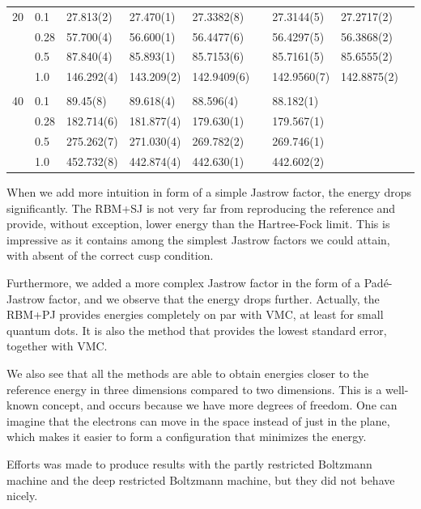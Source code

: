 {\begin{landscape}
\begin{table}
\begin{tabularx}{\hsize}{llR{2.65cm}R{2.65cm}R{2.65cm}R{2.65cm}R{2.65cm}R{2.65cm}R{2.65cm}}
		20 & 0.1 & 27.813(2) & 27.470(1) & 27.3382(8) & & 27.3144(5) & 27.2717(2) \\ 
		& 0.28 & 57.700(4) & 56.600(1) & 56.4477(6) & & 56.4297(5) & 56.3868(2) \\
		& 0.5 & 87.840(4) & 85.893(1) & 85.7153(6) & & 85.7161(5) & 85.6555(2) \\
		& 1.0 & 146.292(4) & 143.209(2) & 142.9409(6) & & 142.9560(7) & 142.8875(2) \\ \hdashline \\
		
		40 & 0.1 & 89.45(8) & 89.618(4) & 88.596(4) & & 88.182(1) \\ 
		& 0.28 & 182.714(6) & 181.877(4) & 179.630(1) & & 179.567(1) \\
		& 0.5 & 275.262(7) & 271.030(4) & 269.782(2) & & 269.746(1) \\
		& 1.0 & 452.732(8) & 442.874(4) & 442.630(1) & & 442.602(2) \\ \hline\hline
	\end{tabularx}
\end{table}
\end{landscape}
}

When we add more intuition in form of a simple Jastrow factor, the energy drops significantly. The RBM+SJ is not very far from reproducing the reference and provide, without exception, lower energy than the Hartree-Fock limit. This is impressive as it contains among the simplest Jastrow factors we could attain, with absent of the correct cusp condition.

Furthermore, we added a more complex Jastrow factor in the form of a Padé-Jastrow factor, and we observe that the energy drops further. Actually, the RBM+PJ provides energies completely on par with VMC, at least for small quantum dots. It is also the method that provides the lowest standard error, together with VMC.  

We also see that all the methods are able to obtain energies closer to the reference energy in three dimensions compared to two dimensions. This is a well-known concept, and occurs because we have more degrees of freedom. One can imagine that the electrons can move in the space instead of just in the plane, which makes it easier to form a configuration that minimizes the energy. 

Efforts was made to produce results with the partly restricted Boltzmann machine and the deep restricted Boltzmann machine, but they did not behave nicely. 

